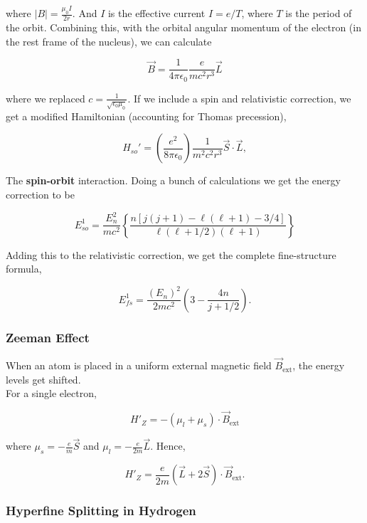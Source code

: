 \documentclass[svgnames]{article}
\begin{document}
where $|B| = \frac{\mu_0 I}{2r}$. And $I$ is the effective current $I = e/T$, where $T$ is the period of the orbit. 
Combining this, with the orbital angular momentum of the electron (in the rest frame of the nucleus), 
we can calculate 

\[
\vec{B} = \frac{1}{4\pi \epsilon_0} \frac{e}{mc^2r^3}\vec{L}
\] \vspace{3px}

where we replaced $c = \frac{1}{\sqrt{\epsilon_0 \mu_0}}$. If we include a spin and relativistic correction, we 
get a modified Hamiltonian (accounting for Thomas precession), 

\[
    H_{so}' = \left( \frac{e^2}{8\pi\epsilon_0} \right) \frac{1}{m^2c^2r^3}\vec{S} \cdot \vec{L} ,
\] \vspace{3px}

The \textbf{spin-orbit} interaction.  Doing a bunch of calculations we get the energy correction to be 

\[
E_{so}^{1} = \frac{E_n^2}{mc^2} \left\{ \frac{n \left[ j(j+1)-\ell(\ell+1) - 3/4 \right] }
{\ell(\ell+1/2)(\ell+1)} \right\}
\] \vspace{3px}


Adding this to the relativistic correction, we get the complete fine-structure formula, 

\[
\boxed{ 
    E_{fs}^{1} = \frac{(E_n)^2}{2mc^2} \left( 3 - \frac{4n}{j + 1/2} \right) .  
}
\] \vspace{3px}

\subsubsection{Zeeman Effect} 

When an atom is placed in a uniform external magnetic field $\vec{B}_\text{ext} $, the energy levels get shifted. \\

For a single electron, 

\[
H'_Z = -(\mu_l + \mu_s) \cdot \vec{B}_\text{ext} 
\] \vspace{3px}

where  $\mu_s = -\frac{e}{m}\vec{S}$ and $\mu_l = -\frac{e}{2m}\vec{L}$. Hence, 

\[
H'_Z = \frac{e}{2m}(\vec{L}+2\vec{S}) \cdot \vec{B}_\text{ext} . 
\] \vspace{3px}

\subsubsection{Hyperfine Splitting in Hydrogen} 
\end{document}
